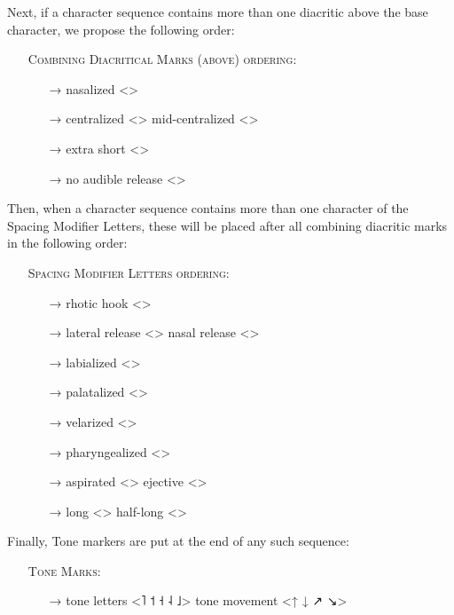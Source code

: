 \noindent Next, if a character sequence contains more than one diacritic above the base
character, we propose the following order:

\begin{itemize}
	\item[] \textsc{Combining Diacritical Marks (above) ordering:}
	\begin{itemize}
	  \item[→] nasalized <>
	  \item[→] centralized <> \textbar{} mid-centralized <>
	  \item[→] extra short <>
	  \item[→] no audible release <>
 \end{itemize} \end{itemize}

\noindent Then, when a character sequence contains more than one character of the Spacing
Modifier Letters, these will be placed after all combining diacritic marks in the
following order:

\begin{itemize}
	\item[] \textsc{Spacing Modifier Letters ordering:}
	\begin{itemize}
	  \item[→] rhotic hook <>
	  \item[→] lateral release <> \textbar{} nasal release <>
	  \item[→] labialized <>
	  \item[→] palatalized <>
	  \item[→] velarized <>
	  \item[→] pharyngealized <>
	  \item[→] aspirated <> \textbar{} ejective <>
	  \item[→] long <> \textbar{} half-long <>
	\end{itemize}
\end{itemize}

\noindent Finally, Tone markers are put at the end of any such sequence:

\begin{itemize}
  \item[] \textsc{Tone Marks:}
  \begin{itemize}
    \item[→] tone letters <˥ ˦ ˧ ˨ ˩> \textbar{} tone movement <↑ ↓ ↗ ↘>
  \end{itemize}
\end{itemize}

